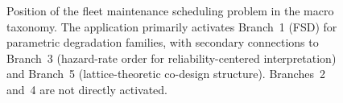 \documentclass[11pt,a4paper]{article}
\theoremstyle{plain}
\theoremstyle{definition}
\theoremstyle{remark}
\begin{document}
\begin{figure}[htbp]
\caption{Position of the fleet maintenance scheduling problem in the macro taxonomy.
The application primarily activates Branch~1 (FSD) for parametric degradation families,
with secondary connections to Branch~3 (hazard-rate order for reliability-centered
interpretation) and Branch~5 (lattice-theoretic co-design structure). Branches~2 and~4
are not directly activated.}
\label{fig:framing:macro_position}
\end{figure}
\end{document}
